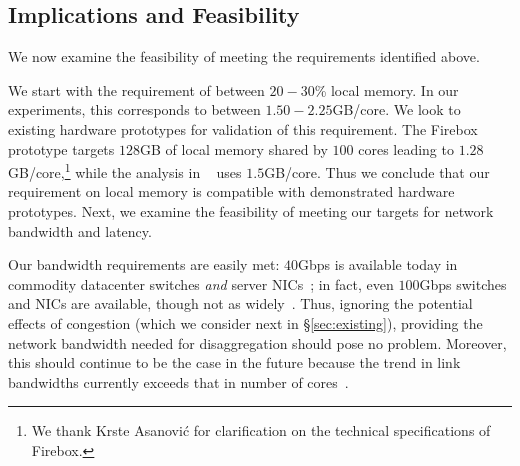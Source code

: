 \subsection{Implications and Feasibility}
\label{ssec:rtt}

We now examine the feasibility of meeting the requirements identified above. 

 We start with the requirement of between $20-30$\% local memory. In our experiments, this corresponds to between $1.50-2.25$GB/core. We look to existing hardware prototypes for validation of this requirement. The Firebox prototype targets $128$GB of local memory shared by $100$ cores leading to $1.28$GB/core,\footnote{We thank Krste Asanovi{\'c} for clarification on the technical specifications of Firebox.} while the analysis in ~\cite{ddcHwDesign1} uses $1.5$GB/core. Thus we conclude that our requirement on local memory is compatible with demonstrated hardware prototypes.
Next, we examine the feasibility of meeting our targets for network bandwidth and latency.


 Our bandwidth requirements are easily met: $40$Gbps is available today in commodity datacenter switches \emph{and} server NICs~\cite{40gnic}; in fact, even $100$Gbps switches and NICs are available, though not as widely~\cite{100gnic}.
Thus, ignoring the potential effects of congestion (which we consider next in \S\ref{sec:existing}), providing the network bandwidth needed for disaggregation should pose no problem. Moreover, this should continue to be the case in the future because the trend in link bandwidths currently exceeds that in number of cores~\cite{hmc1, hmc2, hmc3}.


